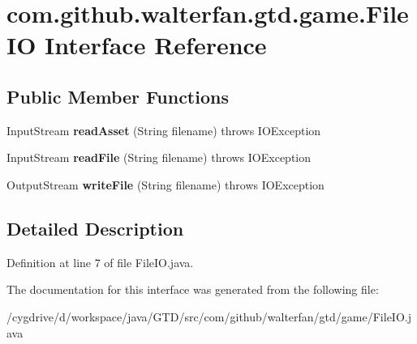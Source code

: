 \hypertarget{interfacecom_1_1github_1_1walterfan_1_1gtd_1_1game_1_1FileIO}{\section{com.\-github.\-walterfan.\-gtd.\-game.\-File\-I\-O Interface Reference}
\label{interfacecom_1_1github_1_1walterfan_1_1gtd_1_1game_1_1FileIO}
}
\subsection*{Public Member Functions}
\begin{DoxyCompactItemize}
\item 
\hypertarget{interfacecom_1_1github_1_1walterfan_1_1gtd_1_1game_1_1FileIO_a3eb8893b906361c330f344ee1c0eaba2}{Input\-Stream {\bfseries read\-Asset} (String filename)  throws I\-O\-Exception}\label{interfacecom_1_1github_1_1walterfan_1_1gtd_1_1game_1_1FileIO_a3eb8893b906361c330f344ee1c0eaba2}

\item 
\hypertarget{interfacecom_1_1github_1_1walterfan_1_1gtd_1_1game_1_1FileIO_ad449722240921b984c5c06eec3832dad}{Input\-Stream {\bfseries read\-File} (String filename)  throws I\-O\-Exception}\label{interfacecom_1_1github_1_1walterfan_1_1gtd_1_1game_1_1FileIO_ad449722240921b984c5c06eec3832dad}

\item 
\hypertarget{interfacecom_1_1github_1_1walterfan_1_1gtd_1_1game_1_1FileIO_a8ac6636889400e2f89fb70756bd32759}{Output\-Stream {\bfseries write\-File} (String filename)  throws I\-O\-Exception}\label{interfacecom_1_1github_1_1walterfan_1_1gtd_1_1game_1_1FileIO_a8ac6636889400e2f89fb70756bd32759}

\end{DoxyCompactItemize}


\subsection{Detailed Description}


Definition at line 7 of file File\-I\-O.\-java.



The documentation for this interface was generated from the following file\-:\begin{DoxyCompactItemize}
\item 
/cygdrive/d/workspace/java/\-G\-T\-D/src/com/github/walterfan/gtd/game/File\-I\-O.\-java\end{DoxyCompactItemize}

